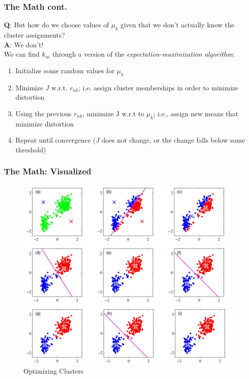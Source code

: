\documentclass{beamer}
\begin{document}
\begin{frame}
\frametitle{The Math cont.}
	\textbf{Q}: But how do we choose values of $\mu_k$ given that we don't actually know the cluster assignments?\\
	\textbf{A}: We don't!\\
	We can find $k_m$ through a version of the \textit{expectation-maximization algorithm}:
	\begin{enumerate}
		\item Initialize some random values for $\mu_k$
		\item Minimize $J$ w.r.t. $r_{nk}$; i.e. assign cluster memberships in order to minimize distortion
		\item Using the previous $r_{nk}$, minimize J w.r.t to $\mu_k$; i.e., assign new means that minimize distortion
		\item Repeat until convergence ($J$ does not change, or the change falls below some threshold)
	\end{enumerate}

\end{frame}

\begin{frame}
 \frametitle{The Math: Visualized}
 \begin{figure}
 	\centering
 	\includegraphics[width=0.7\linewidth]{bishopkmeans}
 	\caption{Optimizing Clusters}
 	\label{fig:bishopkmeans}
 \end{figure}
 
\end{frame}
\end{document}
